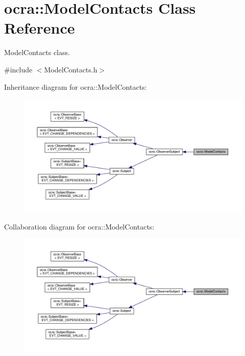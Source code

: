 \hypertarget{classocra_1_1ModelContacts}{}\section{ocra\+:\+:Model\+Contacts Class Reference}
\label{classocra_1_1ModelContacts}


Model\+Contacts class.  




{\ttfamily \#include $<$Model\+Contacts.\+h$>$}



Inheritance diagram for ocra\+:\+:Model\+Contacts\+:
\nopagebreak
\begin{figure}[H]
\begin{center}
\leavevmode
\includegraphics[width=350pt]{db/d08/classocra_1_1ModelContacts__inherit__graph}
\end{center}
\end{figure}


Collaboration diagram for ocra\+:\+:Model\+Contacts\+:
\nopagebreak
\begin{figure}[H]
\begin{center}
\leavevmode
\includegraphics[width=350pt]{dd/d24/classocra_1_1ModelContacts__coll__graph}
\end{center}
\end{figure}
